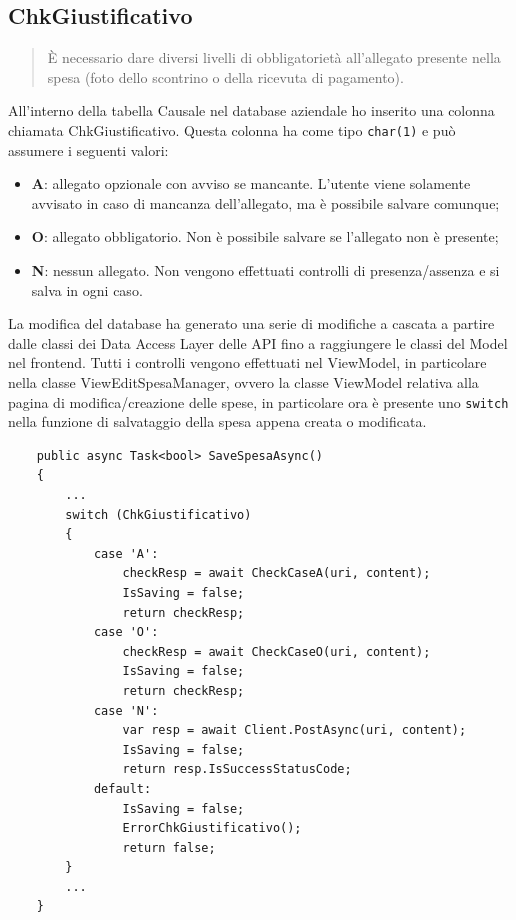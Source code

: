\subsection{ChkGiustificativo}

\begin{quote}
    È necessario dare diversi livelli di obbligatorietà all'allegato presente nella spesa (foto dello scontrino o della ricevuta di pagamento).
\end{quote}

\noindent All'interno della tabella Causale nel database aziendale ho inserito una colonna chiamata ChkGiustificativo. Questa colonna ha come tipo \verb+char(1)+ e può assumere i seguenti valori:
\begin{itemize}
    \item \textbf{A}: allegato opzionale con avviso se mancante. L'utente viene solamente avvisato in caso di mancanza dell'allegato, ma è possibile salvare comunque;
    \item \textbf{O}: allegato obbligatorio. Non è possibile salvare se l'allegato non è presente;
    \item \textbf{N}: nessun allegato. Non vengono effettuati controlli di presenza/assenza e si salva in ogni caso.
\end{itemize}

\noindent La modifica del database ha generato una serie di modifiche a cascata a partire dalle classi dei Data Access Layer delle API fino a raggiungere le classi del Model nel frontend. Tutti i controlli vengono effettuati nel ViewModel, in particolare nella classe ViewEditSpesaManager, ovvero la classe ViewModel relativa alla pagina di modifica/creazione delle spese, in particolare ora è presente uno \verb|switch| nella funzione di salvataggio della spesa appena creata o modificata.

\begin{verbatim}
    public async Task<bool> SaveSpesaAsync()
    {
        ...
        switch (ChkGiustificativo)
        {
            case 'A':
                checkResp = await CheckCaseA(uri, content);
                IsSaving = false;
                return checkResp;
            case 'O':
                checkResp = await CheckCaseO(uri, content);
                IsSaving = false;
                return checkResp;
            case 'N':
                var resp = await Client.PostAsync(uri, content);
                IsSaving = false;
                return resp.IsSuccessStatusCode;
            default:
                IsSaving = false;
                ErrorChkGiustificativo();
                return false;
        }
        ...
    }
\end{verbatim}

